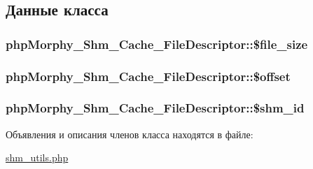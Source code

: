 \subsection{Данные класса}
\hypertarget{classphpMorphy__Shm__Cache__FileDescriptor_a0a67bfc8dd15ebd21a254a76882c35bc}{
\subsubsection[{\$file\_\-size}]{\setlength{\rightskip}{0pt plus 5cm}phpMorphy\_\-Shm\_\-Cache\_\-FileDescriptor::\$file\_\-size}}
\label{classphpMorphy__Shm__Cache__FileDescriptor_a0a67bfc8dd15ebd21a254a76882c35bc}
\hypertarget{classphpMorphy__Shm__Cache__FileDescriptor_a82c0d604fc2d2626a12e6272f658b990}{
\subsubsection[{\$offset}]{\setlength{\rightskip}{0pt plus 5cm}phpMorphy\_\-Shm\_\-Cache\_\-FileDescriptor::\$offset}}
\label{classphpMorphy__Shm__Cache__FileDescriptor_a82c0d604fc2d2626a12e6272f658b990}
\hypertarget{classphpMorphy__Shm__Cache__FileDescriptor_a89a1e5515a1f26f6607b72f8f046c782}{
\subsubsection[{\$shm\_\-id}]{\setlength{\rightskip}{0pt plus 5cm}phpMorphy\_\-Shm\_\-Cache\_\-FileDescriptor::\$shm\_\-id}}
\label{classphpMorphy__Shm__Cache__FileDescriptor_a89a1e5515a1f26f6607b72f8f046c782}


Объявления и описания членов класса находятся в файле:\begin{DoxyCompactItemize}
\item 
\hyperlink{shm__utils_8php}{shm\_\-utils.php}\end{DoxyCompactItemize}

